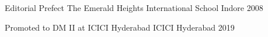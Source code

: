 \begin{cvhonors}
  \cvhonor
    {Editorial Prefect}
    {The Emerald Heights International School}
    {Indore}
    {2008}
\end{cvhonors}
\begin{cvhonors}
  \cvhonor
    {Promoted to DM II}
    {at ICICI Hyderabad}
    {ICICI Hyderabad}
    {2019}
\end{cvhonors}
